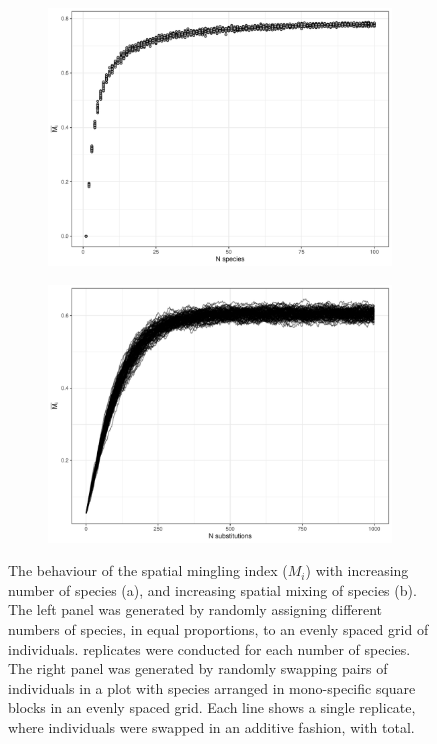 \documentclass[11pt,a4paper]{article}
\begin{document}
\begin{figure}
	\begin{subfigure}{0.45\linewidth}
		\includegraphics[width=\linewidth]{mingling_nspecies}
		\caption{}
		\label{mingling_nspecies}
	\end{subfigure}
	\hfill
	\begin{subfigure}{0.45\linewidth}
		\includegraphics[width=\linewidth]{mingling_nmingl}
		\caption{}
		\label{mingling_nmingl}
	\end{subfigure}
	\caption{The behaviour of the spatial mingling index ($M_{i}$) with increasing number of species (a), and increasing spatial mixing of species (b). The left panel was generated by randomly assigning different numbers of species, in equal proportions, to an evenly spaced grid of individuals. \mispreps{} replicates were conducted for each number of species. The right panel was generated by randomly swapping pairs of individuals in a plot with \minsp{} species arranged in mono-specific square blocks in an evenly spaced grid. Each line shows a single replicate, where individuals were swapped in an additive fashion, with \minreps{} total.} 
	\label{mingling_both}
\end{figure}
\end{document}
